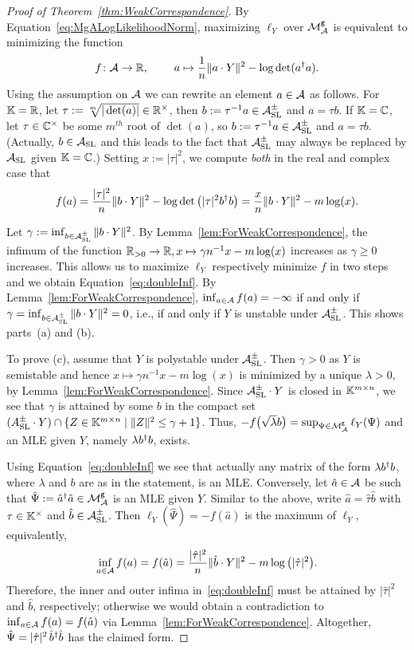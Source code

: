 \begin{proof}[Proof of Theorem~\ref{thm:WeakCorrespondence}]
	By Equation~\eqref{eq:MgALogLikelihoodNorm}, maximizing $\ell_Y$ over $\mathcal{M}^{\mathtt{g}}_{\mathcal{A}}$ is equivalent to minimizing the function
	\begin{align*}
		f \colon \mathcal{A} \to \mathbb R, \; \qquad a \mapsto \frac{1}{n} \|a \cdot Y\|^2 - \log\det(a^{\dagger} a).
	\end{align*}
	Using the assumption on $\mathcal{A}$ we can rewrite an element $a \in \mathcal{A}$ as follows.
	For $\mathbb K = \mathbb R$, let $\tau := \sqrt[m]{|\det(a)|} \in \mathbb R^{\times}$, then $b := \tau^{-1} a \in \mathcal{A}_{\operatorname{SL}}^{\pm}$ and $a = \tau b$. If $\mathbb K = \mathbb C$, let $\tau \in \mathbb C^\times$ be some $m^{th}$ root of $\det(a)$, so $b := \tau^{-1} a \in \mathcal{A}_{\operatorname{SL}}^{\pm}$ and $a = \tau b$. (Actually, $b \in \mathcal{A}_{\operatorname{SL}}$ and this leads to the fact that $\mathcal{A}_{\operatorname{SL}}^{\pm}$ may always be replaced by $\mathcal{A}_{\operatorname{SL}}$ given $\mathbb K = \mathbb C$.) Setting $x := |\tau|^2$, we compute \emph{both} in the real and complex case that
	 \[ f(a) = \frac{|\tau|^2}{n} \| b \cdot Y \|^2 - \log\det \big( |\tau|^2 b^{\dagger} b \big)
	= \frac{x}{n} \|b \cdot Y\|^2 - m \log(x). \]
	
	Let $\gamma := \inf_{b \in \mathcal{A}_{\operatorname{SL}}^{\pm}} \| b \cdot Y\|^2$. By Lemma~\ref{lem:ForWeakCorrespondence}, the infimum of the function $\mathbb R_{>0} \to \mathbb R, x \mapsto \gamma n^{-1} x - m \log(x)$ increases as $\gamma \geq 0$ increases. This allows us to maximize $\ell_Y$ respectively minimize $f$ in two steps and we obtain Equation~\eqref{eq:doubleInf}.
	By Lemma~\ref{lem:ForWeakCorrespondence}, $\inf_{a \in \mathcal{A}} f(a) = - \infty$ if and only if $\gamma = \inf_{b \in \mathcal{A}_{\operatorname{SL}}^{\pm}} \| b \cdot Y\|^2 = 0$, i.e., if and only if $Y$ is unstable under $\mathcal{A}_{\operatorname{SL}}^{\pm}$. This shows parts~(a) and (b).
	
	To prove (c), assume that $Y$ is polystable under $\mathcal{A}_{\operatorname{SL}}^{\pm}$. Then $\gamma > 0$ as $Y$ is semistable and hence $x \mapsto \gamma n^{-1} x - m\log(x)$ is minimized by a unique $\lambda > 0$, by Lemma~\ref{lem:ForWeakCorrespondence}. Since $\mathcal{A}_{\operatorname{SL}}^{\pm} \cdot Y$ is closed in $\mathbb K^{m \times n}$, we see that $\gamma$ is attained by some $b$ in the compact set $(A_{\operatorname{SL}}^{\pm} \cdot Y) \cap \{ Z \in \mathbb K^{m \times n} \mid \|Z\|^2 \leq \gamma + 1 \}$. Thus, $-f \big( \sqrt{\lambda} b \big) = \sup_{\Psi \in \mathcal{M}^{\mathtt{g}}_{\mathcal{A}}} \ell_Y(\Psi)$ and an MLE given $Y$, namely $\lambda b^{\dagger} b$, exists.
	
	Using Equation~\eqref{eq:doubleInf} we see that actually any matrix of the form $\lambda b^{\dagger} b$, where $\lambda$ and $b$ are as in the statement, is an MLE.
	Conversely, let $\hat{a} \in \mathcal{A}$ be such that $\hat{\Psi} := \hat{a}^{\dagger} \hat{a} \in \mathcal{M}^{\mathtt{g}}_{\mathcal{A}}$ is an MLE given $Y$. Similar to the above, write $\hat{a} = \hat{\tau} \hat{b}$ with $\tau \in \mathbb K^{\times}$ and $\hat{b} \in \mathcal{A}_{\operatorname{SL}}^{\pm}$. Then $\ell_{Y}(\hat{\Psi}) = - f(\hat{a})$ is the maximum of $\ell_Y$, equivalently,
		\[ \inf_{a \in \mathcal{A}} f(a)  = f(\hat{a}) = \frac{|\hat{\tau}|^2}{n} \| \hat{b} \cdot Y \|^2 - m \log \big( |\hat{\tau}|^2 \big). \]
	Therefore, the inner and outer infima in~\eqref{eq:doubleInf} must be attained by $|\hat{\tau}|^2$ and $\hat{b}$, respectively; otherwise we would obtain a contradiction to $\inf_{a \in \mathcal{A}} f(a)  = f(\hat{a})$ via Lemma~\ref{lem:ForWeakCorrespondence}. Altogether, $\hat{\Psi} = |\hat{\tau}|^2 \, \hat{b}^{\dagger} \hat{b}$ has the claimed form.
	

\end{proof}
